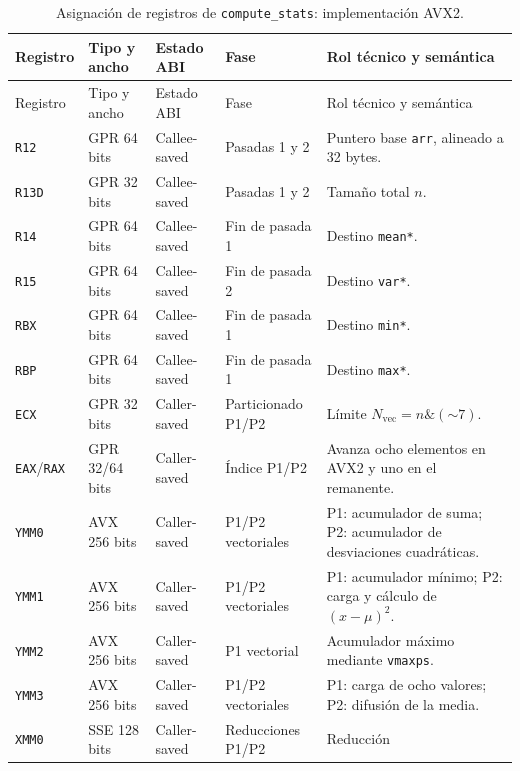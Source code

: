 \documentclass[journal]{IEEEtran}
\begin{document}
\begin{longtable}{@{}>{\raggedright\arraybackslash}p{}
  >{\raggedright\arraybackslash}p{}
  >{\raggedright\arraybackslash}p{}
  >{\raggedright\arraybackslash}p{}
  >{\raggedright\arraybackslash}p{}@{}}
\caption{Asignación de registros de \texttt{compute\_stats}: implementación AVX2.}
\label{tab:compute-stats-avx2-registers}\\
\toprule
Registro & Tipo y ancho & Estado ABI & Fase & Rol técnico y semántica \\
\midrule
\endfirsthead
\toprule
Registro & Tipo y ancho & Estado ABI & Fase & Rol técnico y semántica \\
\midrule
\endhead
\bottomrule
\endfoot
\texttt{R12} & GPR 64 bits & Callee-saved & Pasadas 1 y 2 & Puntero base
  \texttt{arr}, alineado a 32 bytes. \\
\texttt{R13D} & GPR 32 bits & Callee-saved & Pasadas 1 y 2 & Tamaño total $n$. \\
\texttt{R14} & GPR 64 bits & Callee-saved & Fin de pasada 1 & Destino
  \texttt{mean*}. \\
\texttt{R15} & GPR 64 bits & Callee-saved & Fin de pasada 2 & Destino
  \texttt{var*}. \\
\texttt{RBX} & GPR 64 bits & Callee-saved & Fin de pasada 1 & Destino
  \texttt{min*}. \\
\texttt{RBP} & GPR 64 bits & Callee-saved & Fin de pasada 1 & Destino
  \texttt{max*}. \\
\texttt{ECX} & GPR 32 bits & Caller-saved & Particionado P1/P2 & Límite
  $N_{\mathrm{vec}}=n\mathbin{\&}(\mathord{\sim}7)$. \\
\texttt{EAX}/\texttt{RAX} & GPR 32/64 bits & Caller-saved & Índice P1/P2 &
  Avanza ocho elementos en AVX2 y uno en el remanente. \\
\texttt{YMM0} & AVX 256 bits & Caller-saved & P1/P2 vectoriales & P1:
  acumulador de suma; P2: acumulador de desviaciones cuadráticas. \\
\texttt{YMM1} & AVX 256 bits & Caller-saved & P1/P2 vectoriales & P1:
  acumulador mínimo; P2: carga y cálculo de $(x-\mu)^2$. \\
\texttt{YMM2} & AVX 256 bits & Caller-saved & P1 vectorial & Acumulador máximo
  mediante \texttt{vmaxps}. \\
\texttt{YMM3} & AVX 256 bits & Caller-saved & P1/P2 vectoriales & P1: carga
  de ocho valores; P2: difusión de la media. \\
\texttt{XMM0} & SSE 128 bits & Caller-saved & Reducciones P1/P2 & Reducción

\end{longtable}
\end{document}
